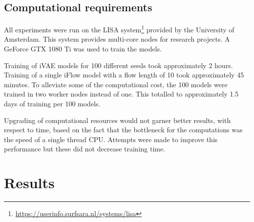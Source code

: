 \subsection{Computational requirements}
\label{sec:requirements}
All experiments were run on the LISA system\footnote{\url{https://userinfo.surfsara.nl/systems/lisa}} provided by the University of Amsterdam. This system provides multi-core nodes for research projects. A GeForce GTX 1080 Ti was used to train the models. 

Training of iVAE models for 100 different seeds took approximately 2 hours. Training of a single iFlow model with a flow length of 10 took approximately 45 minutes. To alleviate some of the computational cost, the 100 models were trained in two worker nodes instead of one. This totalled to approximately 1.5 days of training per 100 models. 

Upgrading of computational resources would not garner better results, with respect to time, based on the fact that the bottleneck for the computations was the speed of a single thread CPU. Attempts were made to improve this performance but these did not decrease training time.

\section{Results}
\label{sec:results}

